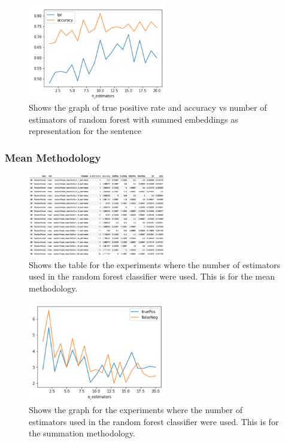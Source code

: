 \documentclass[twoside,twocolumn]{article}
\begin{document}
\begin{figure}[H]
\includegraphics[width=6cm]{randForest_estimators_summed_graph-tpr}
\centering
\caption{Shows the graph of true positive rate and accuracy vs number of estimators of random forest 
with summed embeddings as representation for the sentence}
\end{figure}


\subsubsection{Mean Methodology}

\begin{figure}[H]
\includegraphics[width=6cm]{randForest_estimators_meaned_table}
\centering
\caption{Shows the table for the experiments where the number of estimators used
in the random forest classifier were used. This is for the mean methodology.}
\end{figure}

\begin{figure}[H]
\includegraphics[width=6cm]{randForest_estimators_meaned_graph}
\centering
\caption{Shows the graph for the experiments where the number of estimators used
in the random forest classifier were used. This is for the summation methodology.}
\end{figure}
\end{document}
